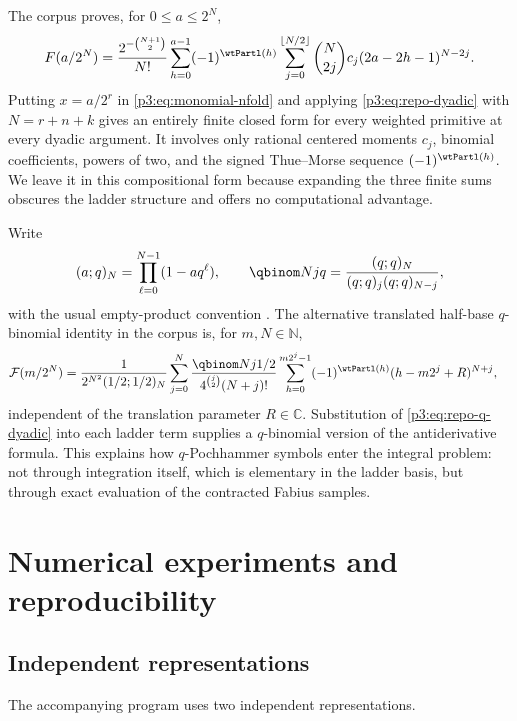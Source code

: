 \documentclass[11pt,oneside]{article}
\theoremstyle{definition}
\theoremstyle{remark}
\newcommand{\C}{\mathbb C}
\newcommand{\N}{\mathbb N}
\newcommand{\1}{\mathbf 1}
\begin{document}
The corpus proves, for $0\le a\le2^N$,
\begin{equation}
 F(a/2^N)=\frac{2^{-\binom{N+1}{2}}}{N!}
 \sum_{h=0}^{a-1}(-1)^{\wtPartl(h)}
 \sum_{j=0}^{\lfloor N/2\rfloor}\binom N{2j}c_j
 (2a-2h-1)^{N-2j}.                                          \label{p3:eq:repo-dyadic}
\end{equation}
Putting $x=a/2^r$ in \eqref{p3:eq:monomial-nfold} and applying
\eqref{p3:eq:repo-dyadic} with $N=r+n+k$ gives an entirely finite closed form for every
weighted primitive at every dyadic argument.  It involves only rational centered moments
$c_j$, binomial coefficients, powers of two, and the signed Thue--Morse sequence
$(-1)^{\wtPartl(h)}$.  We leave it in this compositional form because expanding the three finite
sums obscures the ladder structure and offers no computational advantage.

Write
\begin{equation}
 (a;q)_N=\prod_{\ell=0}^{N-1}(1-aq^\ell),\qquad
 \qbinom Njq=\frac{(q;q)_N}{(q;q)_j(q;q)_{N-j}},              \label{p3:eq:q-notation}
\end{equation}
with the usual empty-product convention \cite{p3:gasper2004}.  The alternative translated
half-base $q$-binomial identity in the corpus is, for $m,N\in\N$,
\begin{align}
 \mathcal F(m/2^N)
 &=\frac{1}{2^{N^2}(1/2;1/2)_N}
 \sum_{j=0}^{N}
 \frac{\qbinom Nj{1/2}}{4^{\binom j2}(N+j)!}
 \sum_{h=0}^{m2^j-1}(-1)^{\wtPartl(h)}(h-m2^j+R)^{N+j},            \label{p3:eq:repo-q-dyadic}
\end{align}
independent of the translation parameter $R\in\C$.  Substitution of
\eqref{p3:eq:repo-q-dyadic} into each ladder term supplies a $q$-binomial version of the
antiderivative formula.  This explains how $q$-Pochhammer symbols enter the integral problem:
not through integration itself, which is elementary in the ladder basis, but through exact
evaluation of the contracted Fabius samples.

\section{Numerical experiments and reproducibility}
\label{p3:sec:numerics}

\subsection{Independent representations}

The accompanying program  uses two independent
representations.
\end{document}
